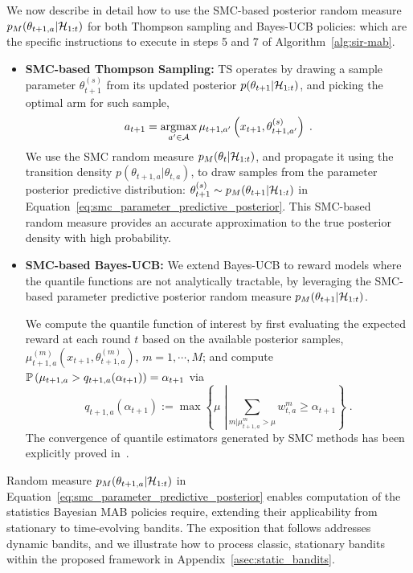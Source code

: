 We now describe in detail how to use the SMC-based posterior random measure $p_M(\theta_{t+1,a}|\mathcal{H}_{1:t})$ for both Thompson sampling and Bayes-UCB policies:
\ie which are the specific instructions to execute in steps 5 and 7 of Algorithm~\ref{alg:sir-mab}.
\begin{itemize}
	\item \textbf{SMC-based Thompson Sampling:}
	TS operates by drawing a sample parameter $\theta_{t+1}^{(s)}$ from its updated posterior $p(\theta_{t+1}|\mathcal{H}_{1:t})$,
	and picking the optimal arm for such sample, \ie
	\begin{equation}
		a_{t+1}=\mathop{\mathrm{argmax}}_{a^\prime \in \mathcal{A}} \mu_{t+1,a^\prime}\left(x_{t+1},\theta_{t+1,a^\prime}^{(s)}\right) \; .
		\label{eq:mc_expected_reward}
	\end{equation}
	We use the SMC random measure $p_M(\theta_t|\mathcal{H}_{1:t})$,
	and propagate it using the transition density $p(\theta_{t+1,a}|\theta_{t,a})$,
	to draw samples from the parameter posterior predictive distribution:
	\ie $\theta_{t+1}^{(s)}\sim p_M(\theta_{t+1}|\mathcal{H}_{1:t})$
	in Equation~\eqref{eq:smc_parameter_predictive_posterior}.
	This SMC-based random measure provides an accurate approximation to the true posterior density with high probability.

	\vspace*{1ex}	
	\item \textbf{SMC-based Bayes-UCB:}
	We extend Bayes-UCB to reward models where the quantile functions are not analytically tractable,
	by leveraging the SMC-based parameter predictive posterior random measure  $p_M(\theta_{t+1}|\mathcal{H}_{1:t})$.

	We compute the quantile function of interest by first 
	evaluating the expected reward at each round $t$ based on the available posterior samples,
	\ie $\mu_{t+1,a}^{(m)}\left(x_{t+1},\theta_{t+1,a}^{(m)}\right)$, $m=1,\cdots,M$;
	and compute
	$
	\mathbb{P}\left( \mu_{t+1,a}>q_{t+1,a}(\alpha_{t+1}) \right) = \alpha_{t+1}
	$
	via
	\begin{equation}
		q_{t+1,a}(\alpha_{t+1}):=\max \left\{\mu \; \left|\sum_{m|\mu_{t+1,a}^m>\mu} w_{t,a}^m\ge\alpha_{t+1} \right. \right\} \; .
		\label{eq:mc_quantile_value}
	\end{equation}
	The convergence of quantile estimators generated by SMC methods has been explicitly proved in~\citep{j-Maiz2012}.
\end{itemize}

Random measure $p_M(\theta_{t+1,a}|\mathcal{H}_{1:t})$ in Equation~\eqref{eq:smc_parameter_predictive_posterior} 
enables computation of the statistics Bayesian MAB policies require,
extending their applicability from stationary to time-evolving bandits.
The exposition that follows addresses dynamic bandits,
and we illustrate how to process classic, stationary bandits within the proposed framework in Appendix~\ref{asec:static_bandits}.


